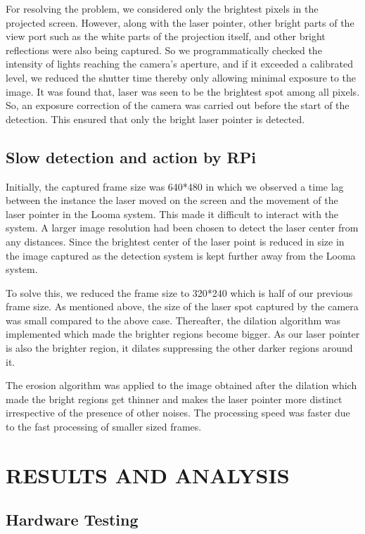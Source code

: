 \documentclass[12pt, a4paper]{article}
\begin{document}
For resolving the problem, we considered only the brightest pixels in the projected screen. However, along with the laser pointer, other bright parts of the view port such as the white parts of the projection itself, and other bright reflections were also being captured. So we programmatically checked the intensity of lights reaching the camera's aperture, and if it exceeded a calibrated level, we reduced the shutter time thereby only allowing minimal exposure to the image. It was found that, laser was seen to be the brightest spot among all pixels. So, an exposure correction of the camera was carried out before the start of the detection. This ensured that only the bright laser pointer is detected.

\subsection{Slow detection and action by RPi}
Initially, the captured frame size was 640*480 in which we observed a time lag between the instance the laser moved on the screen and the movement of the laser pointer in the Looma system. This made it difficult to interact with the system. A larger image resolution had been chosen to detect the laser center from any distances. Since the brightest center of the laser point is reduced in size in the image captured as the detection system is kept further away from the Looma system. 

To solve this, we reduced the frame size to 320*240 which is half of our previous frame size. As mentioned above, the size of the laser spot captured by the camera was small compared to the above case. Thereafter, the dilation algorithm was implemented which made the brighter regions become bigger. As our laser pointer is also the brighter region, it dilates suppressing the other darker regions around it. 

The erosion algorithm was applied to the image obtained after the dilation which made the bright regions get thinner and makes the laser pointer more distinct irrespective of the presence of other noises. The processing speed was faster due to the fast processing of smaller sized frames.

\newpage
\section{RESULTS AND ANALYSIS}

\subsection{Hardware Testing}
\end{document}
